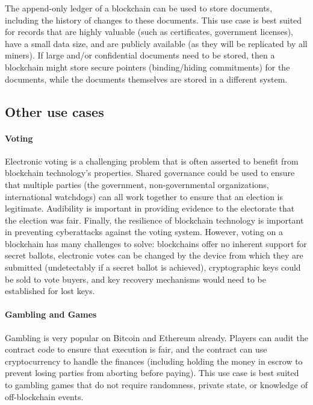 The append-only ledger of a blockchain can be used to store documents, including the history of changes to these documents. This use case is best suited for records that are highly valuable (such as certificates, government licenses), have a small data size, and are publicly available (as they will be replicated by all miners). If large and/or confidential documents need to be stored, then a blockchain might store secure pointers (\ie binding/hiding commitments) for the documents, while the documents themselves are stored in a different system.


\subsection{Other use cases}

\paragraph{Voting}
Electronic voting is a challenging problem that is often asserted to benefit from blockchain technology's properties.
Shared governance could be used to ensure that multiple parties (the government, non-governmental organizations, international watchdogs) can all work together to ensure that an election is legitimate.
Audibility is important in providing evidence to the electorate that the election was fair.
Finally, the resilience of blockchain technology is important in preventing cyberattacks against the voting system.
However, voting on a blockchain has many challenges to solve: blockchains offer no inherent support for secret ballots, electronic votes can be changed by the device from which they are submitted (undetectably if a secret ballot is achieved), cryptographic keys could be sold to vote buyers, and key recovery mechanisms would need to be established for lost keys. 

\paragraph{Gambling and Games}
Gambling is very popular on Bitcoin and Ethereum already. Players can audit the contract code to ensure that execution is fair, and the contract can use cryptocurrency to handle the finances (including holding the money in escrow to prevent losing parties from aborting before paying). This use case is best suited to gambling games that do not require randomness, private state, or knowledge of off-blockchain events.

